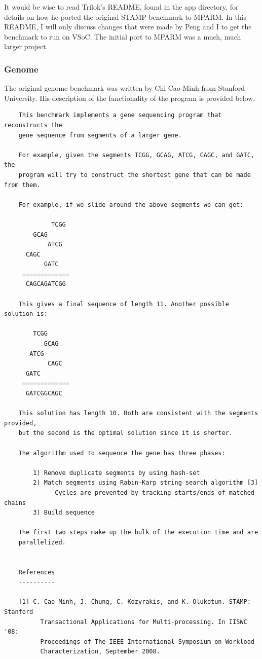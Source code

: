 \documentclass{article}
\begin{document}
It would be wise to read Trilok's README, found in the app directory, for 
details on how he ported the original STAMP benchmark to MPARM. In this README,
I will only discuss changes that were made by Peng and I to get the benchmark
to run on VSoC. The initial port to MPARM was a much, much larger project. 

\subsubsection{Genome}

The original genome benchmark was written by Chi Cao Minh from Stanford 
University. His description of the functionality of the program is provided 
below.

\begin{verbatim}
    This benchmark implements a gene sequencing program that reconstructs the 
    gene sequence from segments of a larger gene.

    For example, given the segments TCGG, GCAG, ATCG, CAGC, and GATC, the 
    program will try to construct the shortest gene that can be made from them.

    For example, if we slide around the above segments we can get:

             TCGG
        GCAG
            ATCG
      CAGC
           GATC
     =============
      CAGCAGATCGG

    This gives a final sequence of length 11. Another possible solution is:

        TCGG
           GCAG
       ATCG
            CAGC
      GATC
     =============
      GATCGGCAGC

    This solution has length 10. Both are consistent with the segments provided,
    but the second is the optimal solution since it is shorter.

    The algorithm used to sequence the gene has three phases:

        1) Remove duplicate segments by using hash-set
        2) Match segments using Rabin-Karp string search algorithm [3]
            - Cycles are prevented by tracking starts/ends of matched chains
        3) Build sequence

    The first two steps make up the bulk of the execution time and are 
    parallelized.


    References
    ----------

    [1] C. Cao Minh, J. Chung, C. Kozyrakis, and K. Olukotun. STAMP: Stanford 
          Transactional Applications for Multi-processing. In IISWC '08: 
          Proceedings of The IEEE International Symposium on Workload 
          Characterization, September 2008. 


\end{verbatim}
\end{document}
